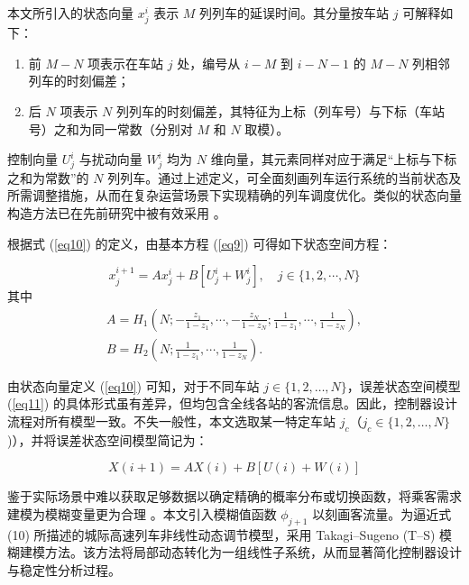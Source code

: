 本文所引入的状态向量 $x_j^i$ 表示 $M$ 列列车的延误时间。其分量按车站 $j$ 可解释如下：

\begin{enumerate}
    \item 前 $M-N$ 项表示在车站 $j$ 处，编号从 $i-M$ 到 $i-N-1$ 的 $M-N$ 列相邻列车的时刻偏差；
    \item 后 $N$ 项表示 $N$ 列列车的时刻偏差，其特征为上标（列车号）与下标（车站号）之和为同一常数（分别对 $M$ 和 $N$ 取模）。
\end{enumerate}

控制向量 $U_j^i$ 与扰动向量 $W_j^i$ 均为 $N$ 维向量，其元素同样对应于满足“上标与下标之和为常数”的 $N$ 列列车。通过上述定义，可全面刻画列车运行系统的当前状态及所需调整措施，从而在复杂运营场景下实现精确的列车调度优化。类似的状态向量构造方法已在先前研究中被有效采用 \cite{Moaveni2018,Khosrosereshki2021}。

根据式 (\ref{eq10}) 的定义，由基本方程 (\ref{eq9}) 可得如下状态空间方程：

\begin{equation} 
	x_{j}^{i+1}=A x_{j}^{i}+B\left[U_{j}^{i}+W_{j}^{i}\right], \quad j \in\{1,2, \cdots, N\}
	\label{eq11}
\end{equation}
其中
\begin{equation*}
	\begin{gathered}
		A=H_1\!\left(N ;-\frac{z_1}{1-z_1}, \cdots,-\frac{z_N}{1-z_N} ;
		\frac{1}{1-z_1}, \cdots, \frac{1}{1-z_N}\right), \\
		B=H_2\!\left(N ; \frac{1}{1-z_1}, \cdots, \frac{1}{1-z_N}\right).
	\end{gathered}
\end{equation*}

由状态向量定义 (\ref{eq10}) 可知，对于不同车站 $j \in \{1,2,\ldots,N\}$，误差状态空间模型 (\ref{eq11}) 的具体形式虽有差异，但均包含全线各站的客流信息。因此，控制器设计流程对所有模型一致。不失一般性，本文选取某一特定车站 $j_c$（$j_c \in \{1,2,\ldots,N\}$)），并将误差状态空间模型简记为：

\begin{equation} 
	X(i+1)=A X(i)+B\left[U(i)+W(i)\right]
	\label{eq12}
\end{equation}

鉴于实际场景中难以获取足够数据以确定精确的概率分布或切换函数，将乘客需求建模为模糊变量更为合理 \cite{Xu2016,Xu2016a}。本文引入模糊值函数 $\phi_{j+1}$ 以刻画客流量。为逼近式 (10) 所描述的城际高速列车非线性动态调节模型，采用 Takagi–Sugeno (T–S) 模糊建模方法。该方法将局部动态转化为一组线性子系统，从而显著简化控制器设计与稳定性分析过程。

